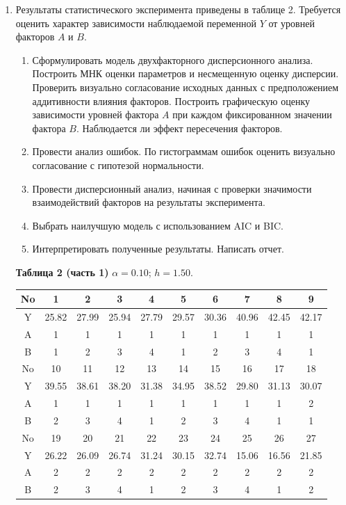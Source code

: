 \documentclass[areasetadvanced]{scrartcl}
\begin{document}
\begin{enumerate}
    \item Результаты статистического эксперимента приведены в таблице 2. Требуется оценить характер зависимости наблюдаемой переменной $Y$ от уровней факторов $A$ и $B$.
    \begin{enumerate}
        \item Сформулировать модель двухфакторного дисперсионного анализа. Построить МНК оценки параметров и несмещенную оценку дисперсии.\\
        Проверить визуально согласование исходных данных с предположением аддитивности влияния факторов. Построить графическую оценку зависимости уровней фактора $A$ при каждом фиксированном значении фактора $B$. Наблюдается ли эффект пересечения факторов.
        \item Провести анализ ошибок. По гистограммам ошибок оценить визуально согласование с гипотезой нормальности.
        \item Провести дисперсионный анализ, начиная с проверки значимости взаимодействий факторов на результаты эксперимента.
        \item Выбрать наилучшую модель с использованием AIC и BIC.
        \item Интерпретировать полученные результаты. Написать отчет.
    \end{enumerate}
    
    \textbf{Таблица 2 (часть 1)} \hspace{1em} $\alpha = 0.10$; $h = 1.50$.
    {\small
    \begin{longtable}{|c|*{9}{c|}}
    \hline
    No & 1 & 2 & 3 & 4 & 5 & 6 & 7 & 8 & 9 \\
    \hline
    Y & 25.82 & 27.99 & 25.94 & 27.79 & 29.57 & 30.36 & 40.96 & 42.45 & 42.17 \\
    \hline
    A & 1 & 1 & 1 & 1 & 1 & 1 & 1 & 1 & 1 \\
    \hline
    B & 1 & 2 & 3 & 4 & 1 & 2 & 3 & 4 & 1 \\
    \hline
    No & 10 & 11 & 12 & 13 & 14 & 15 & 16 & 17 & 18 \\
    \hline
    Y & 39.55 & 38.61 & 38.20 & 31.38 & 34.95 & 38.52 & 29.80 & 31.13 & 30.07 \\
    \hline
    A & 1 & 1 & 1 & 1 & 1 & 1 & 1 & 1 & 2 \\
    \hline
    B & 2 & 3 & 4 & 1 & 2 & 3 & 4 & 1 & 1 \\
    \hline
    No & 19 & 20 & 21 & 22 & 23 & 24 & 25 & 26 & 27 \\
    \hline
    Y & 26.22 & 26.09 & 26.74 & 31.24 & 30.15 & 32.74 & 15.06 & 16.56 & 21.85 \\
    \hline
    A & 2 & 2 & 2 & 2 & 2 & 2 & 2 & 2 & 2 \\
    \hline
    B & 2 & 3 & 4 & 1 & 2 & 3 & 4 & 1 & 2 \\
    \hline
    \end{longtable}
    }
    

\end{enumerate}
\end{document}
